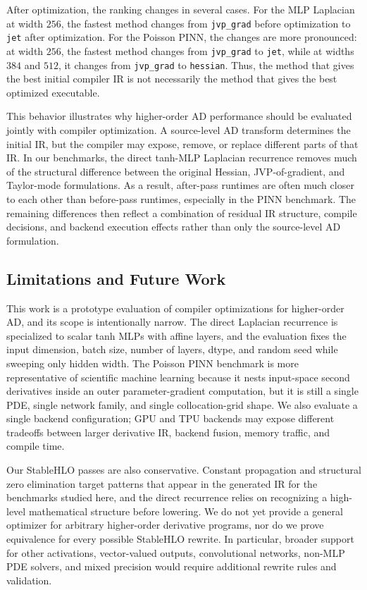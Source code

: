 \documentclass{article}
\theoremstyle{plain}
\theoremstyle{definition}
\theoremstyle{remark}
\begin{document}
After optimization, the ranking changes in several cases.  For the MLP
Laplacian at width \(256\), the fastest method changes from
\texttt{jvp\_grad} before optimization to \texttt{jet} after optimization.  For
the Poisson PINN, the changes are more pronounced: at width \(256\), the fastest
method changes from \texttt{jvp\_grad} to \texttt{jet}, while at widths \(384\)
and \(512\), it changes from \texttt{jvp\_grad} to \texttt{hessian}.  Thus, the
method that gives the best initial compiler IR is not necessarily the method
that gives the best optimized executable.

This behavior illustrates why higher-order AD performance should be evaluated
jointly with compiler optimization.  A source-level AD transform determines the
initial IR, but the compiler may expose, remove, or replace different parts of
that IR.  In our benchmarks, the direct tanh-MLP Laplacian recurrence removes
much of the structural difference between the original Hessian, JVP-of-gradient,
and Taylor-mode formulations.  As a result, after-pass runtimes are often much
closer to each other than before-pass runtimes, especially in the PINN
benchmark.  The remaining differences then reflect a combination of residual
IR structure, compile decisions, and backend execution effects rather than only
the source-level AD formulation.


\subsection{Limitations and Future Work}
This work is a prototype evaluation of compiler optimizations for higher-order
AD, and its scope is intentionally narrow.  The direct Laplacian recurrence is
specialized to scalar tanh MLPs with affine layers, and the evaluation fixes the
input dimension, batch size, number of layers, dtype, and random seed while
sweeping only hidden width.  The Poisson PINN benchmark is more representative
of scientific machine learning because it nests input-space second derivatives
inside an outer parameter-gradient computation, but it is still a single PDE,
single network family, and single collocation-grid shape.  We also evaluate a
single backend configuration; GPU and TPU backends may expose different
tradeoffs between larger derivative IR, backend fusion, memory traffic, and
compile time.

Our StableHLO passes are also conservative.  Constant propagation and
structural zero elimination target patterns that appear in the generated IR for
the benchmarks studied here, and the direct recurrence relies on recognizing a
high-level mathematical structure before lowering.  We do not yet provide a
general optimizer for arbitrary higher-order derivative programs, nor do we
prove equivalence for every possible StableHLO rewrite.  In particular, broader
support for other activations, vector-valued outputs, convolutional networks,
non-MLP PDE solvers, and mixed precision would require additional rewrite rules
and validation.
\end{document}
